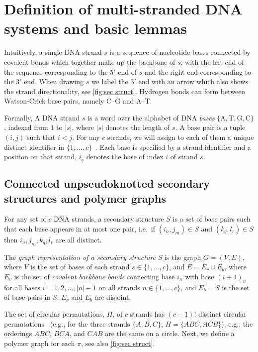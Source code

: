 
\section{Definition of multi-stranded DNA systems and basic lemmas}\label{sec:mfe}

Intuitively, a single DNA strand $s$ is a sequence of nucleotide bases connected by covalent bonds which together make up the backbone of $s$, with the left end of the sequence corresponding to the $5'$ end of $s$ and the right end corresponding to the $3'$ end. When drawing $s$ we label  the $3'$ end with an arrow which also shows the strand directionality, see \cref{fig:sec struct}. Hydrogen bonds can form between Watson-Crick base pairs, namely C–G and A–T.

Formally, A DNA strand $s$ is a word over the alphabet of DNA {\em bases} $\{\mathrm{A},\mathrm{T},\mathrm{G},\mathrm{C}\}$, indexed from 1 to $|s|$, where $|s|$ denotes the length of $s$.
A base pair is a tuple $(i, j)$ such that $i<j$. 
For any $c$ strands, we will assign to each of them a unique distinct identifier in $\{1, . . . ,c\}$~\cite{dirks2007thermodynamic}. Each base is specified by a strand identifier and a position on that strand, $i_s$ denotes the base of index $i$ of strand $s$.

\subsection{Connected unpseudoknotted secondary structures and  polymer graphs}

\begin{Definition}
	For any set of $c$ DNA strands, a secondary structure $S$ is a set of base pairs such that each base appears in at most one pair, i.e.~if $(i_n, j_m)\in S$ and $(k_q, l_r)\in S$ then $i_n,j_m,k_q,l_r$ are all distinct.
\end{Definition}
The {\em graph representation of a  secondary structure} $S$
is the graph $G=(V,E)$, where $V$ is the set of bases of each strand $s \in \{1, . . . ,c\}$, and $E = E_v \cup E_b$, where $E_v$ is the set of \emph{covalent backbone bonds} connecting base $i_n$ with base $(i+1)_n$ for all bases $i = 1,2, ..., |n|-1$ on all strands $n \in \{1, . . . ,c\}$, and $E_b = S$ is the set of base pairs in $S$. $E_v$ and $E_b$ are disjoint.

The set of circular permutations, $\Pi$, of $c$ strands has $(c-1)!$ distinct circular permutations~\cite{brualdi1977introductory} (e.g., for the three strands $\{A, B, C\}$, $\Pi = \{A B C, ACB\}$), 
e.g., the orderings $ABC$, $BCA$, and $CAB$ are the same on a circle. 
Next, we define a  polymer graph for each $\pi$, see also  \cref{fig:sec struct}.

